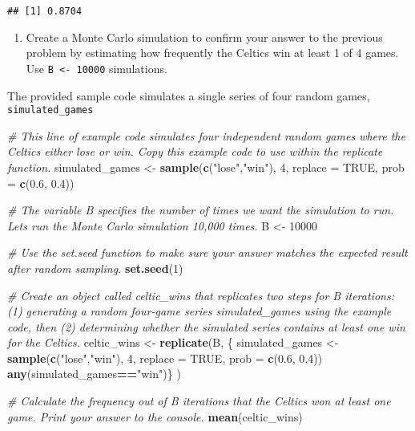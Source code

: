 \documentclass[
]{article}
\newenvironment{Shaded}{\begin{snugshade}}{\end{snugshade}}
\newcommand{\CommentTok}[1]{\textcolor[rgb]{0.56,0.35,0.01}{\textit{#1}}}
\newcommand{\DataTypeTok}[1]{\textcolor[rgb]{0.13,0.29,0.53}{#1}}
\newcommand{\DecValTok}[1]{\textcolor[rgb]{0.00,0.00,0.81}{#1}}
\newcommand{\FloatTok}[1]{\textcolor[rgb]{0.00,0.00,0.81}{#1}}
\newcommand{\KeywordTok}[1]{\textcolor[rgb]{0.13,0.29,0.53}{\textbf{#1}}}
\newcommand{\NormalTok}[1]{#1}
\newcommand{\OperatorTok}[1]{\textcolor[rgb]{0.81,0.36,0.00}{\textbf{#1}}}
\newcommand{\OtherTok}[1]{\textcolor[rgb]{0.56,0.35,0.01}{#1}}
\newcommand{\StringTok}[1]{\textcolor[rgb]{0.31,0.60,0.02}{#1}}
\providecommand{\tightlist}{%
  \setlength{\itemsep}{0pt}\setlength{\parskip}{0pt}}
\begin{document}
\begin{verbatim}
## [1] 0.8704
\end{verbatim}

\begin{enumerate}
\def\labelenumi{\arabic{enumi}.}
\setcounter{enumi}{4}
\tightlist
\item
  Create a Monte Carlo simulation to confirm your answer to the previous
  problem by estimating how frequently the Celtics win at least 1 of 4
  games. Use \texttt{B\ \textless{}-\ 10000} simulations.
\end{enumerate}

The provided sample code simulates a single series of four random games,
\texttt{simulated\_games}

\begin{Shaded}
\begin{Highlighting}[]
\CommentTok{\# This line of example code simulates four independent random games where the Celtics either lose or win. Copy this example code to use within the \textasciigrave{}replicate\textasciigrave{} function.}
\NormalTok{simulated\_games \textless{}{-}}\StringTok{ }\KeywordTok{sample}\NormalTok{(}\KeywordTok{c}\NormalTok{(}\StringTok{"lose"}\NormalTok{,}\StringTok{"win"}\NormalTok{), }\DecValTok{4}\NormalTok{, }\DataTypeTok{replace =} \OtherTok{TRUE}\NormalTok{, }\DataTypeTok{prob =} \KeywordTok{c}\NormalTok{(}\FloatTok{0.6}\NormalTok{, }\FloatTok{0.4}\NormalTok{))}

\CommentTok{\# The variable \textquotesingle{}B\textquotesingle{} specifies the number of times we want the simulation to run. Let\textquotesingle{}s run the Monte Carlo simulation 10,000 times.}
\NormalTok{B \textless{}{-}}\StringTok{ }\DecValTok{10000}

\CommentTok{\# Use the \textasciigrave{}set.seed\textasciigrave{} function to make sure your answer matches the expected result after random sampling.}
\KeywordTok{set.seed}\NormalTok{(}\DecValTok{1}\NormalTok{)}

\CommentTok{\# Create an object called \textasciigrave{}celtic\_wins\textasciigrave{} that replicates two steps for B iterations: (1) generating a random four{-}game series \textasciigrave{}simulated\_games\textasciigrave{} using the example code, then (2) determining whether the simulated series contains at least one win for the Celtics.}
\NormalTok{celtic\_wins \textless{}{-}}\StringTok{ }\KeywordTok{replicate}\NormalTok{(B, \{ }
\NormalTok{  simulated\_games \textless{}{-}}\StringTok{ }\KeywordTok{sample}\NormalTok{(}\KeywordTok{c}\NormalTok{(}\StringTok{"lose"}\NormalTok{,}\StringTok{"win"}\NormalTok{), }\DecValTok{4}\NormalTok{, }\DataTypeTok{replace =} \OtherTok{TRUE}\NormalTok{, }\DataTypeTok{prob =} \KeywordTok{c}\NormalTok{(}\FloatTok{0.6}\NormalTok{, }\FloatTok{0.4}\NormalTok{))}
  \KeywordTok{any}\NormalTok{(simulated\_games}\OperatorTok{==}\StringTok{"win"}\NormalTok{)\}}
\NormalTok{)}

\CommentTok{\# Calculate the frequency out of B iterations that the Celtics won at least one game. Print your answer to the console.}
\KeywordTok{mean}\NormalTok{(celtic\_wins)}
\end{Highlighting}
\end{Shaded}
\end{document}
